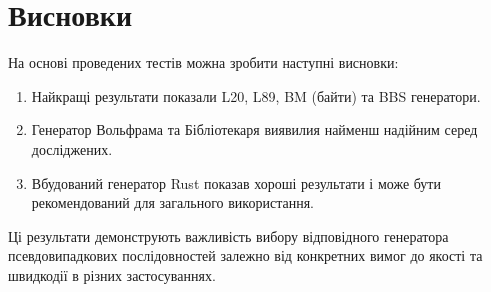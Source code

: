\documentclass[12pt]{article}
\begin{document}
\section{Висновки}
На основі проведених тестів можна зробити наступні висновки:
\begin{enumerate}
\item Найкращі результати показали L20, L89, BM (байти) та BBS генератори.
\item Генератор Вольфрама та Бібліотекаря виявилия найменш надійним серед досліджених.
\item Вбудований генератор Rust показав хороші результати і може бути рекомендований для загального використання.
\end{enumerate}

Ці результати демонструють важливість вибору відповідного генератора псевдовипадкових послідовностей залежно від конкретних вимог до якості та швидкодії в різних застосуваннях.
\end{document}
